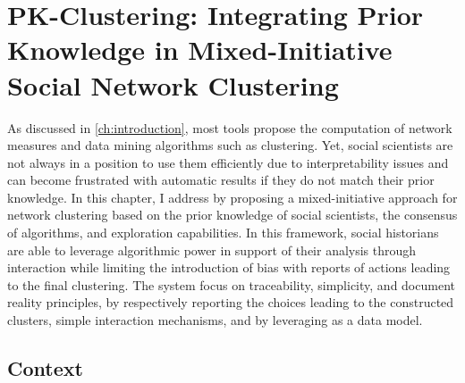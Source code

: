 \chapter{PK-Clustering: Integrating Prior Knowledge in Mixed-Initiative
Social Network Clustering}\label{ch:pk-clustering}
\minitoc

As discussed in \autoref{ch:introduction}, most \sna tools propose the computation of network measures and data mining algorithms such as clustering.
Yet, social scientists are not always in a position to use them efficiently due to interpretability issues and can become frustrated with automatic results if they do not match their prior knowledge.
In this chapter, I address \qthree by proposing a mixed-initiative approach for network clustering based on the prior knowledge of social scientists, the consensus of algorithms, and exploration capabilities.
In this framework, social historians are able to leverage algorithmic power in support of their analysis through interaction while limiting the introduction of bias with reports of actions leading to the final clustering.
The system focus on traceability, simplicity, and document reality principles, by respectively reporting the choices leading to the constructed clusters, simple interaction mechanisms, and by leveraging \modelplural as a data model.


\section{Context}

